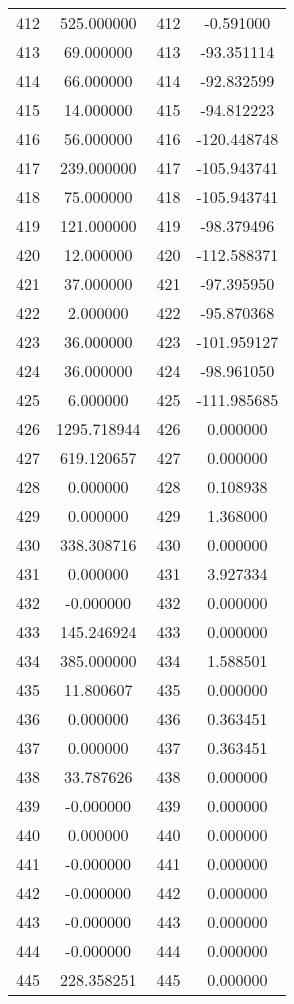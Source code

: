\documentclass[12pt]{article}
\begin{document}
\begin{longtable}{@{}cccc@{}}
412 & 525.000000 & 412 & -0.591000 \\
413 & 69.000000 & 413 & -93.351114 \\
414 & 66.000000 & 414 & -92.832599 \\
415 & 14.000000 & 415 & -94.812223 \\
416 & 56.000000 & 416 & -120.448748 \\
417 & 239.000000 & 417 & -105.943741 \\
418 & 75.000000 & 418 & -105.943741 \\
419 & 121.000000 & 419 & -98.379496 \\
420 & 12.000000 & 420 & -112.588371 \\
421 & 37.000000 & 421 & -97.395950 \\
422 & 2.000000 & 422 & -95.870368 \\
423 & 36.000000 & 423 & -101.959127 \\
424 & 36.000000 & 424 & -98.961050 \\
425 & 6.000000 & 425 & -111.985685 \\
426 & 1295.718944 & 426 & 0.000000 \\
427 & 619.120657 & 427 & 0.000000 \\
428 & 0.000000 & 428 & 0.108938 \\
429 & 0.000000 & 429 & 1.368000 \\
430 & 338.308716 & 430 & 0.000000 \\
431 & 0.000000 & 431 & 3.927334 \\
432 & -0.000000 & 432 & 0.000000 \\
433 & 145.246924 & 433 & 0.000000 \\
434 & 385.000000 & 434 & 1.588501 \\
435 & 11.800607 & 435 & 0.000000 \\
436 & 0.000000 & 436 & 0.363451 \\
437 & 0.000000 & 437 & 0.363451 \\
438 & 33.787626 & 438 & 0.000000 \\
439 & -0.000000 & 439 & 0.000000 \\
440 & 0.000000 & 440 & 0.000000 \\
441 & -0.000000 & 441 & 0.000000 \\
442 & -0.000000 & 442 & 0.000000 \\
443 & -0.000000 & 443 & 0.000000 \\
444 & -0.000000 & 444 & 0.000000 \\
445 & 228.358251 & 445 & 0.000000 \\

\end{longtable}
\end{document}

